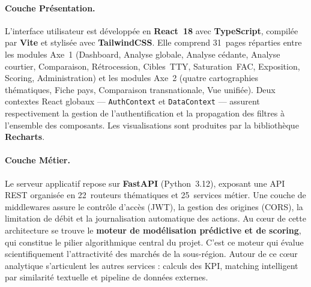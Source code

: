 \documentclass[../main.tex]{subfiles}
\begin{document}
\begin{figure}[H]
{%
}
\end{figure}

\paragraph{Couche Présentation.} L'interface utilisateur est développée en \textbf{React~18} avec \textbf{TypeScript}, compilée par \textbf{Vite} et stylisée avec \textbf{TailwindCSS}. Elle comprend 31~pages réparties entre les modules Axe~1 (Dashboard, Analyse globale, Analyse cédante, Analyse courtier, Comparaison, Rétrocession, Cibles~TTY, Saturation~FAC, Exposition, Scoring, Administration) et les modules Axe~2 (quatre cartographies thématiques, Fiche pays, Comparaison transnationale, Vue unifiée). Deux contextes React globaux --- \texttt{AuthContext} et \texttt{DataContext} --- assurent respectivement la gestion de l'authentification et la propagation des filtres à l'ensemble des composants. Les visualisations sont produites par la bibliothèque \textbf{Recharts}.

\paragraph{Couche Métier.} Le serveur applicatif repose sur \textbf{FastAPI} (Python~3.12), exposant une API REST organisée en 22~routeurs thématiques et 25~services métier. Une couche de middlewares assure le contrôle d'accès (JWT), la gestion des origines (CORS), la limitation de débit et la journalisation automatique des actions. Au cœur de cette architecture se trouve le \textbf{moteur de modélisation prédictive et de scoring}, qui constitue le pilier algorithmique central du projet. C'est ce moteur qui évalue scientifiquement l'attractivité des marchés de la sous-région. Autour de ce cœur analytique s'articulent les autres services : calculs des KPI, matching intelligent par similarité textuelle et pipeline de données externes.
\end{document}

